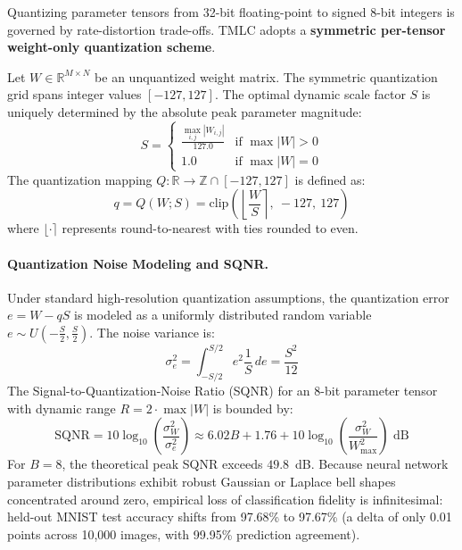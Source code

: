 \documentclass[11pt,a4paper]{article}
\begin{document}
Quantizing parameter tensors from 32-bit floating-point to signed 8-bit integers is governed by rate-distortion trade-offs. TMLC adopts a \textbf{symmetric per-tensor weight-only quantization scheme}.

Let $W \in \mathbb{R}^{M \times N}$ be an unquantized weight matrix. The symmetric quantization grid spans integer values $[-127, 127]$. The optimal dynamic scale factor $S$ is uniquely determined by the absolute peak parameter magnitude:
\begin{equation}
S = \begin{cases} \frac{\max_{i,j} |W_{i,j}|}{127.0} & \text{if } \max |W| > 0 \\ 1.0 & \text{if } \max |W| = 0 \end{cases}
\end{equation}
The quantization mapping $Q : \mathbb{R} \to \mathbb{Z} \cap [-127, 127]$ is defined as:
\begin{equation}
q = Q(W; S) = \text{clip}\left( \left\lfloor \frac{W}{S} \right\rceil, \ -127, \ 127 \right)
\end{equation}
where $\lfloor \cdot \rceil$ represents round-to-nearest with ties rounded to even.


\paragraph{Quantization Noise Modeling and SQNR.}
Under standard high-resolution quantization assumptions, the quantization error $e = W - q S$ is modeled as a uniformly distributed random variable $e \sim U\left(-\frac{S}{2}, \frac{S}{2}\right)$. The noise variance is:
\begin{equation}
\sigma_e^2 = \int_{-S/2}^{S/2} e^2 \frac{1}{S} \, de = \frac{S^2}{12}
\end{equation}
The Signal-to-Quantization-Noise Ratio (SQNR) for an 8-bit parameter tensor with dynamic range $R = 2 \cdot \max|W|$ is bounded by:
\begin{equation}
\text{SQNR} = 10 \log_{10}\left( \frac{\sigma_W^2}{\sigma_e^2} \right) \approx 6.02 B + 1.76 + 10 \log_{10}\left(\frac{\sigma_W^2}{W_{\max}^2}\right) \text{ dB}
\end{equation}
For $B = 8$, the theoretical peak SQNR exceeds $49.8$~dB. Because neural network parameter distributions exhibit robust Gaussian or Laplace bell shapes concentrated around zero, empirical loss of classification fidelity is infinitesimal: held-out MNIST test accuracy shifts from 97.68\% to 97.67\% (a delta of only 0.01 points across 10,000 images, with 99.95\% prediction agreement).
\end{document}
